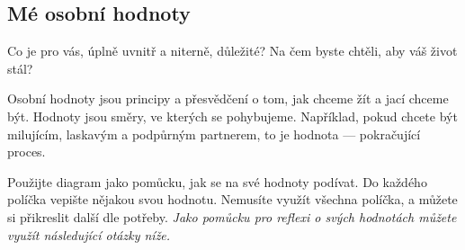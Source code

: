 	\subsection{Mé osobní hodnoty \normalPencilLeftDown}
		Co je pro vás, úplně uvnitř a niterně, důležité? Na čem byste chtěli, aby váš život stál?
		\begin{center}
		\end{center}

		Osobní hodnoty jsou principy a přesvědčení o tom, jak chceme žít a jací chceme být. Hodnoty jsou směry, ve kterých se pohybujeme. Například, pokud chcete být milujícím, laskavým a podpůrným partnerem, to je hodnota — pokračující proces.

		Použijte diagram jako pomůcku, jak se na své hodnoty podívat. Do každého políčka vepište nějakou svou hodnotu. Nemusíte využít všechna políčka, a můžete si přikreslit další dle potřeby. \emph{Jako pomůcku pro reflexi o svých hodnotách můžete využít následující otázky níže.}

